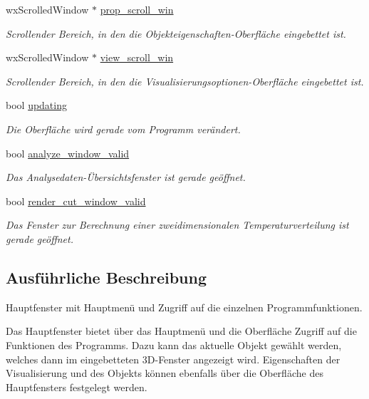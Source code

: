 \begin{DoxyCompactItemize}
wx\-Scrolled\-Window $\ast$ \hyperlink{classGUIMainWindow_a1c120efb232cf3d371a3a6231619b808}{prop\-\_\-scroll\-\_\-win}
\begin{DoxyCompactList}\small\item\em Scrollender Bereich, in den die Objekteigenschaften-\/\-Oberfläche eingebettet ist. \end{DoxyCompactList}\item 
wx\-Scrolled\-Window $\ast$ \hyperlink{classGUIMainWindow_ad440f7451fd3fdabbe48518a89e61e45}{view\-\_\-scroll\-\_\-win}
\begin{DoxyCompactList}\small\item\em Scrollender Bereich, in den die Visualisierungsoptionen-\/\-Oberfläche eingebettet ist. \end{DoxyCompactList}\item 
bool \hyperlink{classGUIMainWindow_afdc35b04c0fe94e4d0080f659ecbce8c}{updating}
\begin{DoxyCompactList}\small\item\em Die Oberfläche wird gerade vom Programm verändert. \end{DoxyCompactList}\item 
bool \hyperlink{classGUIMainWindow_a1f65a053fadac47033fef38c4b0e8a69}{analyze\-\_\-window\-\_\-valid}
\begin{DoxyCompactList}\small\item\em Das Analysedaten-\/Übersichtsfenster ist gerade geöffnet. \end{DoxyCompactList}\item 
bool \hyperlink{classGUIMainWindow_a4f08d8e4294955a3cc0b071dd3cad0d2}{render\-\_\-cut\-\_\-window\-\_\-valid}
\begin{DoxyCompactList}\small\item\em Das Fenster zur Berechnung einer zweidimensionalen Temperaturverteilung ist gerade geöffnet. \end{DoxyCompactList}\end{DoxyCompactItemize}


\subsection{Ausführliche Beschreibung}
Hauptfenster mit Hauptmenü und Zugriff auf die einzelnen Programmfunktionen. 

Das Hauptfenster bietet über das Hauptmenü und die Oberfläche Zugriff auf die Funktionen des Programms. Dazu kann das aktuelle Objekt gewählt werden, welches dann im eingebetteten 3\-D-\/\-Fenster angezeigt wird. Eigenschaften der Visualisierung und des Objekts können ebenfalls über die Oberfläche des Hauptfensters festgelegt werden. 

